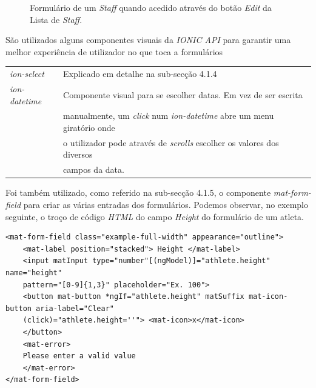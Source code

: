 \begin{figure}[h]
	\begin{center}
	\end{center}
	\caption{Formulário de um \textit{Staff} quando acedido através do botão \textit{Edit} da Lista de \textit{Staff}.}\label{fig:formupdate}
\end{figure}


São utilizados alguns componentes visuais da \textit{IONIC API} para garantir uma melhor experiência de utilizador no que toca a formulários\\

\begin{tabular}{ll}
	\textit{ion-select} & Explicado em detalhe na sub-secção 4.1.4\\
	\textit{ion-datetime} & Componente visual para se escolher datas. Em vez de ser escrita \\
	&manualmente, um \textit{click} num \textit{ion-datetime} abre um menu giratório onde \\
	&o utilizador pode através de \textit{scrolls} escolher os valores dos diversos \\
	&campos da data. 
	\\
\end{tabular}

Foi também utilizado, como referido na sub-secção 4.1.5, o componente \textit{mat-form-field} para criar as várias entradas dos formulários. Podemos observar, no exemplo seguinte, o troço de código \textit{HTML} do campo \textit{Height} do formulário de um atleta.

\begin{lstlisting}
<mat-form-field class="example-full-width" appearance="outline">
	<mat-label position="stacked"> Height </mat-label>
	<input matInput type="number"[(ngModel)]="athlete.height" name="height"
	pattern="[0-9]{1,3}" placeholder="Ex. 100">
	<button mat-button *ngIf="athlete.height" matSuffix mat-icon-button aria-label="Clear"
	(click)="athlete.height=''"> <mat-icon>x</mat-icon>
	</button>
	<mat-error>
	Please enter a valid value
	</mat-error>
</mat-form-field>
\end{lstlisting}

